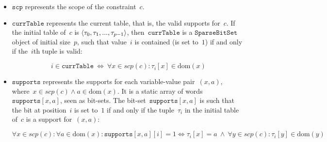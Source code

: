 \documentclass[a4paper,11pt]{article}
\newcommand{\Dom}[1]{\text{dom}({#1})}
\newcommand{\SparseBitSet}{\texttt{SparseBitSet}}
\newcommand{\Scp}{\texttt{scp}}
\newcommand{\CurrTable}{\texttt{currTable}}
\newcommand{\Supports}{\texttt{supports}}
\numberwithin{equation}{section}
\begin{document}
\begin{itemize}
  \item $\Scp$ represents the scope of the constraint~$c$.
  \item $\CurrTable$ represents the current table,
    that is, the valid supports for~$c$. If the initial table of~$c$ is
    $\left\langle\tau_0, \tau_1, ..., \tau_{p-1}\right\rangle$, then~$\CurrTable$ is a 
    $\SparseBitSet$ object of initial size~$p$, such that value~$i$
    is contained (is set to~$1$) if and only if the~$i$th tuple is valid:
    
    \begin{equation} \label{eq:currtable}
      i \in \CurrTable \ \Leftrightarrow \ \forall x \in scp(c): \tau_i[x] \in \Dom{x}
    \end{equation}

  \item $\Supports$ represents the supports for each variable-value pair~$(x,a)$,
    where~$x \in scp(c) \land a \in \Dom{x}$.
    It is a static array of words~$\Supports[x,a]$, seen as bit-sets.
    The bit-set~$\Supports[x,a]$ is such that
    the bit at position~$i$ is set to~$1$ if and only if the 
    tuple~$\tau_i$ in the initial table of~$c$ is a support for~$(x,a)$:

    \begin{equation}
      \forall x \in scp(c): \forall a \in \Dom{x}:
      \Supports[x,a][i] = 1 \Leftrightarrow \tau_i[x] = a \ \land \
      \forall y \in scp(c): \tau_i[y] \in \Dom{y}
    \end{equation}


    

\end{itemize}
\end{document}
